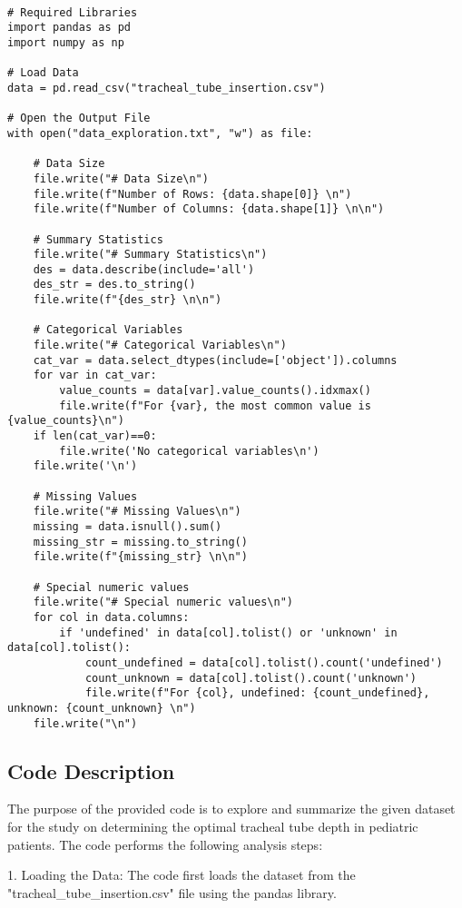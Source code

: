 \documentclass[11pt]{article}
\begin{document}
\begin{verbatim}

# Required Libraries
import pandas as pd
import numpy as np

# Load Data
data = pd.read_csv("tracheal_tube_insertion.csv")

# Open the Output File
with open("data_exploration.txt", "w") as file:

    # Data Size
    file.write("# Data Size\n")
    file.write(f"Number of Rows: {data.shape[0]} \n")
    file.write(f"Number of Columns: {data.shape[1]} \n\n")
    
    # Summary Statistics
    file.write("# Summary Statistics\n")
    des = data.describe(include='all')
    des_str = des.to_string()
    file.write(f"{des_str} \n\n")
    
    # Categorical Variables
    file.write("# Categorical Variables\n")
    cat_var = data.select_dtypes(include=['object']).columns
    for var in cat_var:
        value_counts = data[var].value_counts().idxmax()
        file.write(f"For {var}, the most common value is {value_counts}\n")
    if len(cat_var)==0:
        file.write('No categorical variables\n')
    file.write('\n')
    
    # Missing Values
    file.write("# Missing Values\n")
    missing = data.isnull().sum()
    missing_str = missing.to_string()
    file.write(f"{missing_str} \n\n")

    # Special numeric values
    file.write("# Special numeric values\n")
    for col in data.columns:
        if 'undefined' in data[col].tolist() or 'unknown' in data[col].tolist():
            count_undefined = data[col].tolist().count('undefined')
            count_unknown = data[col].tolist().count('unknown')
            file.write(f"For {col}, undefined: {count_undefined}, unknown: {count_unknown} \n")
    file.write("\n")

\end{verbatim}

\subsection{Code Description}

The purpose of the provided code is to explore and summarize the given dataset for the study on determining the optimal tracheal tube depth in pediatric patients. The code performs the following analysis steps:

1. Loading the Data:
   The code first loads the dataset from the "tracheal\_tube\_insertion.csv" file using the pandas library.
\end{document}
